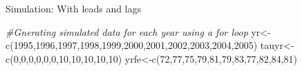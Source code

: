 \documentclass[
  ignorenonframetext,
]{beamer}
\newenvironment{Shaded}{\begin{snugshade}}{\end{snugshade}}
\newcommand{\CommentTok}[1]{\textcolor[rgb]{0.56,0.35,0.01}{\textit{#1}}}
\newcommand{\DecValTok}[1]{\textcolor[rgb]{0.00,0.00,0.81}{#1}}
\newcommand{\FunctionTok}[1]{\textcolor[rgb]{0.00,0.00,0.00}{#1}}
\newcommand{\NormalTok}[1]{#1}
\newcommand{\OtherTok}[1]{\textcolor[rgb]{0.56,0.35,0.01}{#1}}
\begin{document}
\begin{frame}[fragile]{Simulation: With leads and lags}
\protect\hypertarget{simulation-with-leads-and-lags-1}{}
\tiny

\begin{Shaded}
\begin{Highlighting}[]
\CommentTok{\#Gnerating simulated data for each year using a for loop}
\NormalTok{yr}\OtherTok{\textless{}{-}}\FunctionTok{c}\NormalTok{(}\DecValTok{1995}\NormalTok{,}\DecValTok{1996}\NormalTok{,}\DecValTok{1997}\NormalTok{,}\DecValTok{1998}\NormalTok{,}\DecValTok{1999}\NormalTok{,}\DecValTok{2000}\NormalTok{,}\DecValTok{2001}\NormalTok{,}\DecValTok{2002}\NormalTok{,}\DecValTok{2003}\NormalTok{,}\DecValTok{2004}\NormalTok{,}\DecValTok{2005}\NormalTok{)}
\NormalTok{tauyr}\OtherTok{\textless{}{-}}\FunctionTok{c}\NormalTok{(}\DecValTok{0}\NormalTok{,}\DecValTok{0}\NormalTok{,}\DecValTok{0}\NormalTok{,}\DecValTok{0}\NormalTok{,}\DecValTok{0}\NormalTok{,}\DecValTok{0}\NormalTok{,}\DecValTok{10}\NormalTok{,}\DecValTok{10}\NormalTok{,}\DecValTok{10}\NormalTok{,}\DecValTok{10}\NormalTok{,}\DecValTok{10}\NormalTok{)}
\NormalTok{yrfe}\OtherTok{\textless{}{-}}\FunctionTok{c}\NormalTok{(}\DecValTok{72}\NormalTok{,}\DecValTok{77}\NormalTok{,}\DecValTok{75}\NormalTok{,}\DecValTok{79}\NormalTok{,}\DecValTok{81}\NormalTok{,}\DecValTok{79}\NormalTok{,}\DecValTok{83}\NormalTok{,}\DecValTok{77}\NormalTok{,}\DecValTok{82}\NormalTok{,}\DecValTok{84}\NormalTok{,}\DecValTok{81}\NormalTok{)}


\end{Highlighting}
\end{Shaded}
\end{frame}
\end{document}
